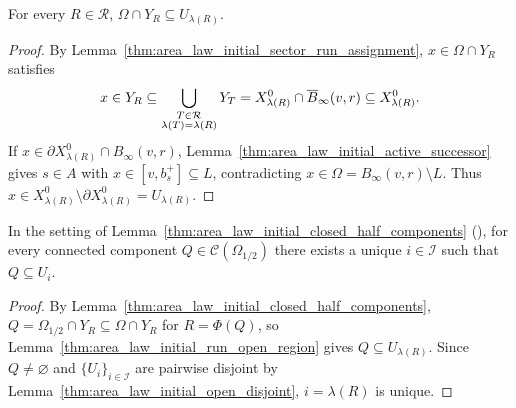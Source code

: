 \begin{lemma}
    \label{thm:area_law_initial_run_open_region}
    \leanok
    For every $R\in\mathcal R$, $\Omega\cap Y_R\subseteq U_{\lambda(R)}$.
\end{lemma}
\begin{proof}\leanok
    By Lemma~\ref{thm:area_law_initial_sector_run_assignment}, $x\in\Omega\cap Y_R$ satisfies
    \begin{align}
        x\in Y_R \subseteq \bigcup_{\substack{T\in\mathcal R \\\lambda(T)=\lambda(R)}}Y_T = X_{\lambda(R)}^0\cap\overline B_\infty(v,r) \subseteq X_{\lambda(R)}^0. \notag
    \end{align}
    If $x\in\partial X_{\lambda(R)}^0\cap B_\infty(v,r)$, Lemma~\ref{thm:area_law_initial_active_successor} gives $s\in A$ with $x\in[v,b_s^+]\subseteq L$, contradicting $x\in\Omega=B_\infty(v,r)\setminus L$.
    Thus $x\in X_{\lambda(R)}^0\setminus\partial X_{\lambda(R)}^0=U_{\lambda(R)}$.
\end{proof}

\begin{lemma}
    \label{thm:area_law_initial_closed_half_unique_region}
    \leanok
    In the setting of Lemma~\ref{thm:area_law_initial_closed_half_components} (\cite[Section~11]{OpenAI2026AreaLaw}), for every connected component $Q\in\mathcal C(\Omega_{1/2})$ there exists a unique $i\in\mathcal I$ such that $Q\subseteq U_i$.
\end{lemma}
\begin{proof}\leanok
    By Lemma~\ref{thm:area_law_initial_closed_half_components}, $Q=\Omega_{1/2}\cap Y_R\subseteq\Omega\cap Y_R$ for $R=\Phi(Q)$, so Lemma~\ref{thm:area_law_initial_run_open_region} gives $Q\subseteq U_{\lambda(R)}$.
    Since $Q\neq\varnothing$ and $\{U_i\}_{i\in\mathcal I}$ are pairwise disjoint by Lemma~\ref{thm:area_law_initial_open_disjoint}, $i=\lambda(R)$ is unique.
\end{proof}
